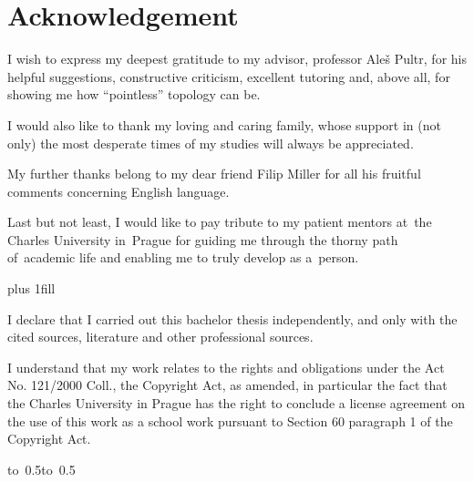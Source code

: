 \documentclass[12pt,a4paper]{report}
\let\openright=\clearpage
\theoremstyle{plain}
\theoremstyle{definition}
\theoremstyle{remark}
\numberwithin{equation}{section}
\begin{document}
\newpage



\openright

\noindent
\section*{Acknowledgement}

I wish to express my deepest gratitude to my advisor, professor Aleš Pultr, for
his helpful suggestions, constructive criticism, excellent tutoring and, above
all, for showing me how ``pointless'' topology can be.

I would also like to thank my loving and caring family, whose support in (not
only) the most desperate times of my studies will always be appreciated.

My further thanks belong to my dear friend Filip Miller for all his fruitful
comments concerning English language.

Last but not least, I would like to pay tribute to my patient mentors at~the
Charles University in~Prague for guiding me through the thorny path of~academic
life and enabling me to truly develop as a~person.

\newpage


\vglue 0pt plus 1fill

\noindent
I declare that I carried out this bachelor thesis independently, and only with the cited
sources, literature and other professional sources.

\medskip\noindent
I understand that my work relates to the rights and obligations under the Act No.
121/2000 Coll., the Copyright Act, as amended, in particular the fact that the Charles
University in Prague has the right to conclude a license agreement on the use of this
work as a school work pursuant to Section 60 paragraph 1 of the Copyright Act.

\vspace{10mm}

\hbox{\hbox to 0.5\hbox to 0.5}

\vspace{20mm}
\newpage
\end{document}
